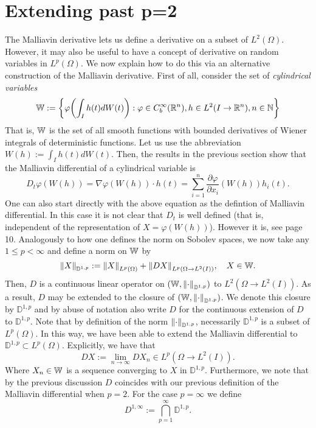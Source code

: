 \documentclass[12pt]{article}
\begin{document}
\section{Extending past p=2}
The Malliavin derivative lets us define a derivative on a subset of $L^2(\Omega)$. However, it may also be useful to have a concept of derivative
on random variables in $L^p(\Omega)$. We now explain how to do this via an alternative construction of the Malliavin derivative. First of all, consider the set of \emph{cylindrical variables}
\begin{equation*}
	\mathbb{W}:=\left\{\varphi\qty(\int_{I}h(t) dW(t)):\varphi\in C_b^\infty({\mathbb R}^n), h\in L^2(I\to{\mathbb R}^n), n \in \mathbb{N} \right\}
\end{equation*}
That is, $\mathbb{W}$ is the set of all smooth functions with bounded derivatives of Wiener integrals of deterministic functions. Let us use the abbreviation  $W(h):=\int_{I}h(t) dW(t)$.
Then, the results in the previous section show that the Malliavin differential of a cylindrical variable is
\begin{equation*}
	D_t\varphi(W(h))=\nabla\varphi(W(h))\cdot h(t)=\sum_{i=1}^{n} \frac{\partial \varphi}{\partial x_i}(W(h))h_i(t).
\end{equation*}
One can also start directly with the above equation as the defintion of Malliavin differential.
In this case it is not clear that $D_t$ is well defined (that is, independent of the representation of  $X=\varphi(W(h))$). However it is, see \cite{hairer2021introduction} page 10.
Analogously to how one defines the norm on Sobolev spaces, we now take any $1\leq p< \infty $ and define a norm on $\mathbb{W}$ by
\begin{equation*}
	\norm{X}_{\mathbb{D}^{1,p}}:=\norm{X}_{L^p(\Omega)}+\norm{DX}_{L^p(\Omega\to L^2(I))},\quad X\in \mathbb{W}.
\end{equation*}
Then, $D$ is a continuous linear operator on $(\mathbb{W},\norm{\cdot }_{\mathbb{D}^{1,p}})$ to $L^2(\Omega\to L^2(I))$. As a result, $D$ may be extended to the closure of $(\mathbb{W},\norm{\cdot }_{\mathbb{D}^{1,p}})$. We denote this closure by $\mathbb{D}^{1,p}$ and by abuse of notation also write $D$ for the continuous extension of  $D$ to $\mathbb{D}^{1,p}$. Note that by definition of the norm $\norm{\cdot }_{\mathbb{D}^{1,p}}$, necessarily $\mathbb{D}^{1,p}$ is a subset of $L^p(\Omega)$. In this way, we have been
able to extend the Malliavin differential to $\mathbb{D}^{1,p}\subset L^p(\Omega)$. Explicitly, we have that
\begin{equation*}
	D X:=\lim_{n \to \infty}D X_n \in L^p(\Omega\to L^2(I)).
\end{equation*}
Where $X_n \in \mathbb{W}$ is a sequence converging to  $X$ in  $\mathbb{D}^{1,p}$. Furthermore, we note that by the previous discussion $D$ coincides with our previous definition
of the Malliavin differential when $p=2$. For the case $p=\infty$ we define
\begin{equation*}
	D^{1,\infty}:=\bigcap_{p=1} ^\infty \mathbb{D}^{1,p}.
\end{equation*}
\end{document}
